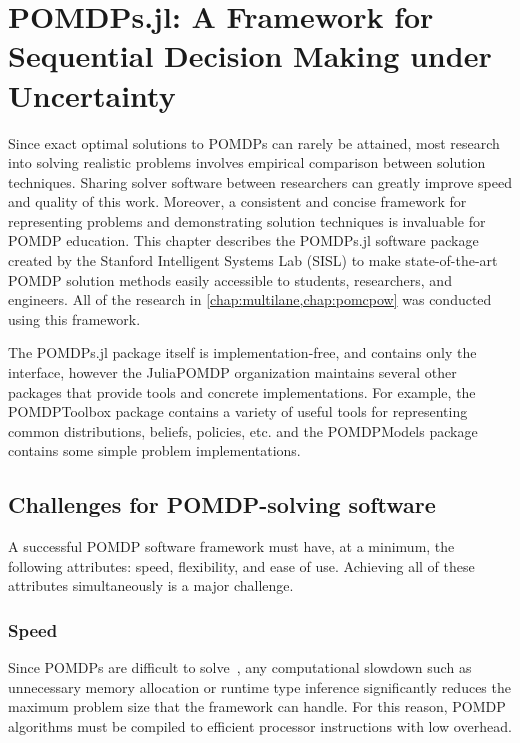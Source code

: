 \chapter{POMDPs.jl: A Framework for Sequential Decision Making under Uncertainty} \label{chap:pomdpsjl}

Since exact optimal solutions to POMDPs can rarely be attained, most research into solving realistic problems involves empirical comparison between solution techniques.
Sharing solver software between researchers can greatly improve speed and quality of this work.
Moreover, a consistent and concise framework for representing problems and demonstrating solution techniques is invaluable for POMDP education.
This chapter describes the POMDPs.jl software package created by the Stanford Intelligent Systems Lab (SISL) to make state-of-the-art POMDP solution methods easily accessible to students, researchers, and engineers.
All of the research in \cref{chap:multilane,chap:pomcpow} was conducted using this framework.

The POMDPs.jl package itself is implementation-free, and contains only the interface, however the JuliaPOMDP organization maintains several other packages that provide tools and concrete implementations. For example, the POMDPToolbox package contains a variety of useful tools for representing common distributions, beliefs, policies, etc. and the POMDPModels package contains some simple problem implementations.

\section{Challenges for POMDP-solving software}

A successful POMDP software framework must have, at a minimum, the following attributes: speed, flexibility, and ease of use. Achieving all of these attributes simultaneously is a major challenge.

\subsection{Speed}

Since POMDPs are difficult to solve~\cite{papadimitriou1987complexity}, any computational slowdown such as unnecessary memory allocation or runtime type inference significantly reduces the maximum problem size that the framework can handle.
For this reason, POMDP algorithms must be compiled to efficient processor instructions with low overhead.

